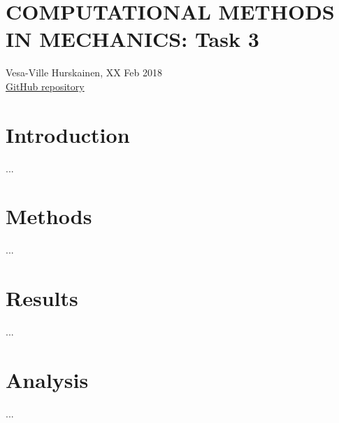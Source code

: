 \documentclass{article}
\begin{document}
	\section*{COMPUTATIONAL METHODS IN MECHANICS: Task 3}
	Vesa-Ville Hurskainen, XX Feb 2018\\
	\href{https://github.com/VesaVilleHurskainen/cmim2018}{GitHub repository}

	\section*{Introduction}
	...

	\section*{Methods}
	...

	\section*{Results}
	...
	
	\begin{figure}[htb]
		\def\svgwidth{0.5\textwidth}
		
	\end{figure}

	\section*{Analysis}
	...
\end{document}
